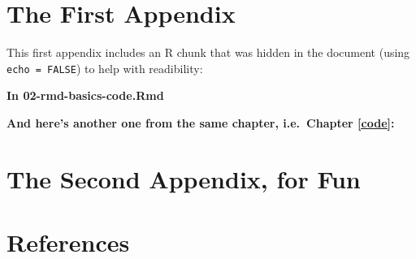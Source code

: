 \documentclass[a4paper, nobind]{templates/ociamthesis}
\newlength{\cslhangindent}
\newenvironment{CSLReferences}[2] %
 {%
  \setlength{\parindent}{0pt}
  \ifodd #1
  \let\oldpar\par
  \def\par{\hangindent=\cslhangindent\oldpar}
  \fi
  \setlength{\parskip}{1mm}
  \setlength{\baselineskip}{6mm}
 }%
 {}
\begin{document}
\startappendices

\hypertarget{the-first-appendix}{%
\chapter{The First Appendix}\label{the-first-appendix}}

This first appendix includes an R chunk that was hidden in the document (using \texttt{echo\ =\ FALSE}) to help with readibility:

\textbf{In 02-rmd-basics-code.Rmd}

\textbf{And here's another one from the same chapter, i.e.~Chapter \ref{code}:}

\hypertarget{the-second-appendix-for-fun}{%
\chapter{The Second Appendix, for Fun}\label{the-second-appendix-for-fun}}

\hypertarget{references}{%
\chapter*{References}\label{references}}


\hypertarget{refs}{}
\begin{CSLReferences}{0}{0}
\end{CSLReferences}

\end{document}

